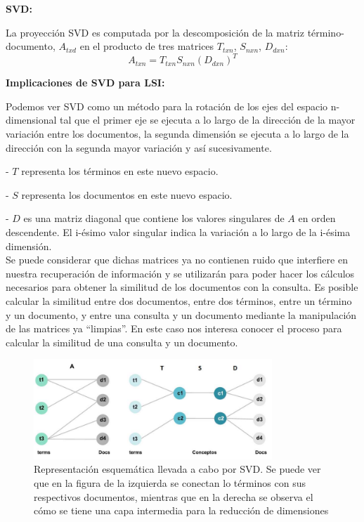 \documentclass[runningheads]{llncs}
\begin{document}
\textbf{SVD:}

La proyección SVD es computada por la descomposición de la matriz término-documento, $A_{txd}$ en el producto de tres matrices $T_{txn}$, $S_{nxn}$, $D_{dxn}$:
\begin{equation}
A_{txn} = T_{txn}S_{nxn}{(D_{dxn})}^T
\end{equation}

\textbf{Implicaciones de SVD para LSI:}

Podemos ver SVD como un método para la rotación de los ejes del espacio n-dimensional tal que el primer eje se ejecuta a lo largo de la dirección de la mayor variación entre los documentos, la segunda dimensión se ejecuta a lo largo de la dirección con la segunda mayor variación y así sucesivamente.

- $T$ representa los términos en este nuevo espacio. 

- $S$ representa los documentos en este nuevo espacio. 

- $D$ es una matriz diagonal que contiene los valores singulares de $A$ en orden descendente. El i-ésimo valor singular indica la variación a lo largo de la i-ésima dimensión. \\

Se puede considerar que dichas matrices ya no contienen ruido que interfiere en nuestra recuperación de información y se utilizarán para poder hacer los cálculos necesarios para obtener la similitud de los documentos con la consulta. Es posible calcular la similitud entre dos documentos, entre dos términos, entre un término y un documento, y entre una consulta y un documento mediante la manipulación de las matrices ya “limpias”. En este caso nos interesa conocer el proceso para calcular la similitud de una consulta y un documento.

\begin{figure}[htb]
\centering
\includegraphics[width=0.8\textwidth]{grafico.png}
\caption{Representación esquemática llevada a cabo por SVD. Se puede ver que en la figura de la izquierda se conectan lo términos con sus respectivos documentos, mientras que en la derecha se observa el cómo  se tiene una capa intermedia para la reducción de dimensiones}
\label{fig:tigre}
\end{figure} 
\end{document}
